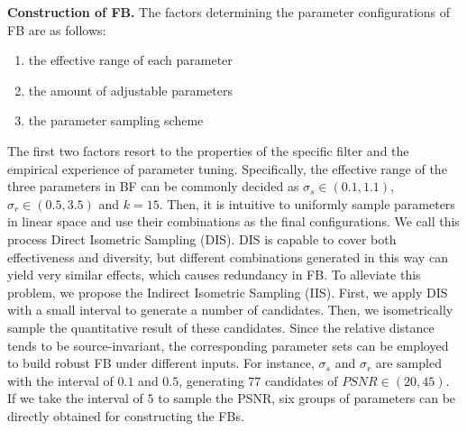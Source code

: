 \documentclass[twocolumn]{svjour3}          %
\begin{document}
\textbf{Construction of FB.}
The factors determining the parameter configurations of FB are as follows:
\begin{enumerate}
	\item the effective range of each parameter
	\item the amount of adjustable parameters
	\item the parameter sampling scheme
\end{enumerate}
The first two factors resort to the properties of the specific filter and the empirical experience of parameter tuning. Specifically, the effective range of the three parameters in BF can be commonly decided as $\sigma_{s} \in (0.1, 1.1)$, $\sigma_{r} \in (0.5, 3.5)$ and $k = 15$. Then, it is intuitive to uniformly sample parameters in linear space and use their combinations as the final configurations. We call this process Direct Isometric Sampling (DIS). DIS is capable to cover both effectiveness and diversity, but different combinations generated in this way can yield very similar effects, which causes redundancy in FB. To alleviate this problem, we propose the Indirect Isometric Sampling (IIS). First, we apply DIS with a small interval to generate a number of candidates. Then, we isometrically sample the quantitative result of these candidates. Since the relative distance tends to be source-invariant, the corresponding parameter sets can be employed to build robust FB under different inputs. For instance, $\sigma_{s}$ and $\sigma_{r}$ are sampled with the interval of $0.1$ and $0.5$, generating $77$ candidates of $PSNR \in (20,45)$. If we take the interval of $5$ to sample the PSNR, six groups of parameters can be directly obtained for constructing the FBs.

\begin{table}[h]
	\footnotesize
\end{table}
\end{document}
